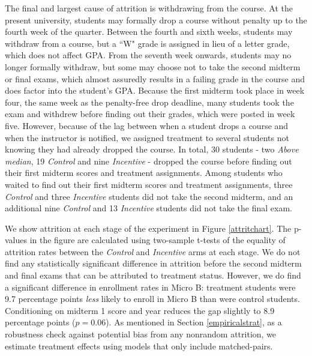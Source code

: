 \documentclass[12pt]{article}
\begin{document}
The final and largest cause of attrition is withdrawing from the course. At the present university, students may formally drop a course without penalty up to the fourth week of the quarter. Between the fourth and sixth weeks, students may withdraw from a course, but a ``W" grade is assigned in lieu of a letter grade, which does not affect GPA. From the seventh week onwards, students may no longer formally withdraw, but some may choose not to take the second midterm or final exams, which almost assuredly results in a failing grade in the course and does factor into the student's GPA. Because the first midterm took place in week four, the same week as the penalty-free drop deadline, many students took the exam and withdrew before finding out their grades, which were posted in week five. However, because of the lag between when a student drops a course and when the instructor is notified, we assigned treatment to several students not knowing they had already dropped the course. In total, 30 students - two \textit{Above median}, 19 \textit{Control} and nine \textit{Incentive} - dropped the course before finding out their first midterm scores and treatment assignments. Among students who waited to find out their first midterm scores and treatment assignments, three \textit{Control} and three \textit{Incentive} students did not take the second midterm, and an additional nine \textit{Control} and 13 \textit{Incentive} students did not take the final exam.

We show attrition at each stage of the experiment in Figure \ref{attritchart}. The p-values in the figure are calculated using two-sample t-tests of the equality of attrition rates between the \textit{Control} and \textit{Incentive} arms at each stage. We do not find any statistically significant difference in attrition before the second midterm and final exams that can be attributed to treatment status. However, we do find a significant difference in enrollment rates in Micro B: treatment students were 9.7 percentage points \textit{less} likely to enroll in Micro B than were control students. Conditioning on midterm 1 score and year reduces the gap slightly to 8.9 percentage points ($p=0.06$). As mentioned in Section \ref{empiricalstrat}, as a robustness check against potential bias from any nonrandom attrition, we estimate treatment effects using models that only include matched-pairs.
\end{document}
